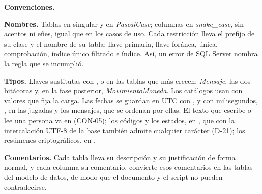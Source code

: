 \textbf{Convenciones.}

\begin{reglas}
  \item \textbf{Nombres.} Tablas en singular y en \textit{PascalCase}; columnas en \textit{snake\_case}, sin acentos ni eñes, igual que en los casos de uso. Cada restricción lleva el prefijo de su clase y el nombre de su tabla:  llave primaria,  llave foránea,  única,  comprobación,  índice único filtrado e  índice. Así, un error de SQL Server nombra la regla que se incumplió.
  \item \textbf{Tipos.} Llaves sustitutas con , o  en las tablas que más crecen: \textit{Mensaje}, las dos bitácoras y, en la fase posterior, \textit{MovimientoMoneda}. Los catálogos usan  con valores que fija la carga. Las fechas se guardan en UTC con , y con milisegundos, , en las jugadas y los mensajes, que se ordenan por ellas. El texto que escribe o lee una persona va en  (\mbox{CON-05}); los códigos y los estados, en , que con la intercalación UTF-8 de la base también admite cualquier carácter (\mbox{D-21}); los resúmenes criptográficos, en .
  \item \textbf{Comentarios.} Cada tabla lleva su descripción y su justificación de forma normal, y cada columna su comentario.  convierte esos comentarios en las tablas del modelo de datos, de modo que el documento y el script no pueden contradecirse.
\end{reglas}
